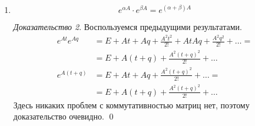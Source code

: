 \documentclass[a4paper,11pt]{article}
\theoremstyle{definition}
\theoremstyle{remark}
\newtheorem*{evidence}{Доказательство}
\begin{document}
\begin{enumerate}
\begin{evidence}
\begin{align*}
        e^Ae^B &= (E+A+\frac{A^2}{2!}+\dots)(E+B+\frac{B^2}{2!}+\dots) = \\
        &= E+A+B+\underbrace{\frac{A^2}{2!}+AB+\frac{B^2}{2!}}+\dots
      \end{align*}
      \begin{align*}
        e^{A+B} &= (E+A+B+\frac{(A+B)^2}{2!}+\dots) = \\
        &= (E+A+B+\underbrace{\frac{A^2}{2!}+\frac{AB+BA}{2!}+\frac{B^2}{2!}}+\dots) \qed
      \end{align*}
      Для того, чтобы $e^A\cdot e^B=e^{A+B}$, матрицы $A$ и $B$ должны коммутировать.
    \end{evidence}
    \item
      \begin{equation*}
        \boxed{e^{\alpha A}\cdot e^{\beta A} = e^{(\alpha+\beta)A}}
      \end{equation*}
      \begin{evidence}
        Воспользуемся предыдущими результатами.
        \begin{align*}
          e^{At}e^{Aq} &= E+At+Aq+\frac{A^2t^2}{2!}+AtAq+\frac{A^2q^2}{2!}+\dots = \\
          &= E+A(t+q)+\frac{A^2(t+q)^2}{2!}+\dots \\
          e^{A(t+q)} &= E+At+Aq+\frac{A^2(t+q)^2}{2!}+\dots = \\
          &= E+A(t+q)+\frac{A^2(t+q)^2}{2!}+\dots
        \end{align*}
        Здесь никаких проблем с коммутативностью матриц нет, поэтому доказательство очевидно. \qed
      \end{evidence}
\end{enumerate}
\end{document}
